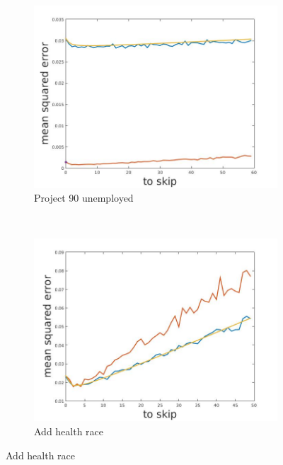 \documentclass[12pt]{report}
\begin{document}
\begin{figure}[h]
\begin{subfigure}[b]{0.3\textwidth}
    \end{subfigure}
    ~
    \begin{subfigure}[b]{0.3\textwidth}
        \includegraphics[width=\textwidth]{estimators_unemployed}
        \caption{ Project 90 unemployed }

    \end{subfigure}
    ~
    \begin{subfigure}[b]{0.3\textwidth}
        \includegraphics[width=\textwidth]{estimators_racesc}
        \caption{ Add health race }

    \end{subfigure}
    

\end{figure}
\end{document}
